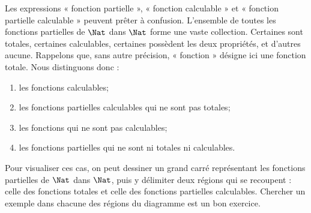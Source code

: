 \documentclass[../../../include/open-logic-section]{subfiles}
\begin{document}
Les expressions « fonction partielle »,
« fonction calculable » et « fonction
partielle calculable » peuvent prêter à
confusion. L'ensemble de toutes les
fonctions partielles de $\Nat$ dans
$\Nat$ forme une vaste collection.
Certaines sont totales, certaines
calculables, certaines possèdent les
deux propriétés, et d'autres aucune.
Rappelons que, sans autre précision,
« fonction » désigne ici une fonction
totale. Nous distinguons donc :
\begin{enumerate}
\item les fonctions calculables;
\item les fonctions partielles calculables
  qui ne sont pas totales;
\item les fonctions qui ne sont pas calculables;
\item les fonctions partielles qui ne sont
  ni totales ni calculables.
\end{enumerate}
Pour visualiser ces cas, on peut dessiner
un grand carré représentant les fonctions
partielles de $\Nat$ dans $\Nat$, puis
y délimiter deux régions qui se recoupent :
celle des fonctions totales et celle des
fonctions partielles calculables. Chercher
un exemple dans chacune des régions du
diagramme est un bon exercice.
\end{document}
